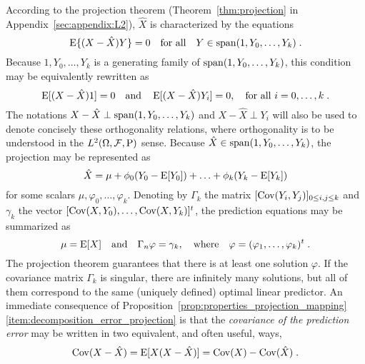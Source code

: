 According to the projection theorem
(Theorem~\ref{thm:projection} in Appendix~\ref{sec:appendix:L2}), $\hat{X}$ is
characterized by the equations
$$
  \operatorname{E} \{ (X - \hat{X}) Y \} = 0 \quad \text{for all} \quad Y \in \operatorname{span}(1,Y_0, \dots, Y_k) \; .
$$
Because $1, Y_0, \dots, Y_k$ is a generating family of $\operatorname{span}(1,Y_0, \dots, Y_k)$, this condition may be equivalently rewritten as
$$
\operatorname{E}[(X - \hat{X})1] = 0 \quad \text{and} \quad \operatorname{E}[(X - \hat{X})Y_i]= 0, \quad \text{for all $ i =0, \dotsc, k$} \; .
$$
The notations $X-\hat{X} \perp \operatorname{span}(1,Y_0, \dots, Y_k)$ and $X-\hat{X}
\perp Y_i$ will also be used to denote concisely these orthogonality relations,
where orthogonality is to be understood in the $L^2(\Omega,\mathcal{F},\operatorname{P})$
sense. Because $\hat{X} \in \operatorname{span}(1,Y_0, \dots, Y_k)$, the projection may be represented as
\begin{equation}
  \label{eq:predictor:represent}
  \hat{X} = \mu + \phi_0 (Y_0 - \operatorname{E}[Y_0]) + \dotsc + \phi_k (Y_k -\operatorname{E}[Y_k])
\end{equation}
for some scalars $\mu, \varphi_0, \dots, \varphi_k$. Denoting by $\Gamma_k$ the
matrix $[ \operatorname{Cov}(Y_i,Y_j) ]_{0 \leq i,j \leq k}$ and $\gamma_k$ the vector
$[\operatorname{Cov}(X,Y_0), \dotsc, \operatorname{Cov}(X,Y_k)]^t$, the prediction equations may be
summarized as
\begin{equation}
  \label{eq:proj_scalar_sol}
  \mu = \operatorname{E}[X] \quad \text{and} \quad \Gamma_n \varphi = \gamma_k, \quad \text{where} \quad \varphi = (\varphi_1, \dots, \varphi_k)^t \; .
\end{equation}
The projection theorem guarantees that there is at least one solution
$\varphi$. If the covariance matrix $\Gamma_k$ is singular, there are
infinitely many solutions, but all of them correspond to the same (uniquely
defined) optimal linear predictor. An immediate consequence of
Proposition~\ref{prop:properties_projection_mapping}\ref{item:decomposition_error_projection}
is that the {\em covariance of the prediction error} may be written in two
equivalent, and often useful, ways,
\begin{equation}
  \label{eq:proj_error}
  \operatorname{Cov}(X-\hat{X}) = \operatorname{E}[X(X-\hat{X})] = \operatorname{Cov}(X) - \operatorname{Cov}(\hat{X}) \; .
\end{equation}

